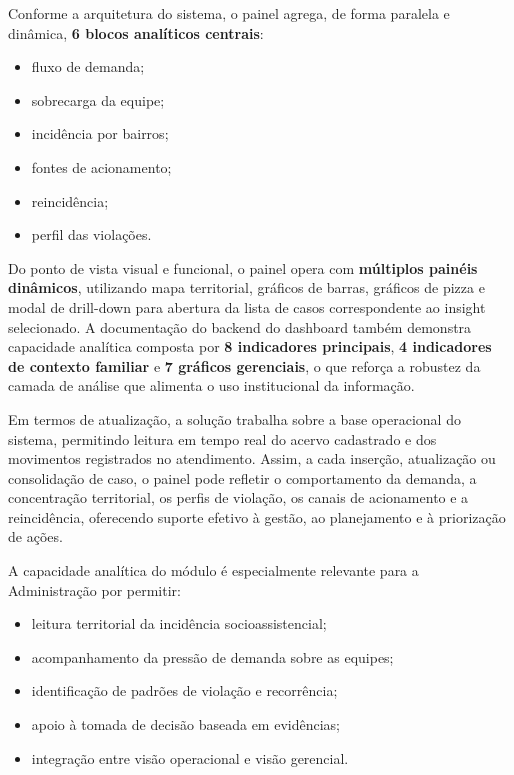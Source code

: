 \documentclass[12pt,a4paper]{article}
\begin{document}
Conforme a arquitetura do sistema, o painel agrega, de forma paralela e dinâmica, \textbf{6 blocos analíticos centrais}:

\begin{itemize}[leftmargin=1.5cm]
\item fluxo de demanda;
\item sobrecarga da equipe;
\item incidência por bairros;
\item fontes de acionamento;
\item reincidência;
\item perfil das violações.
\end{itemize}

Do ponto de vista visual e funcional, o painel opera com \textbf{múltiplos painéis dinâmicos}, utilizando mapa territorial, gráficos de barras, gráficos de pizza e modal de drill-down para abertura da lista de casos correspondente ao insight selecionado. A documentação do backend do dashboard também demonstra capacidade analítica composta por \textbf{8 indicadores principais}, \textbf{4 indicadores de contexto familiar} e \textbf{7 gráficos gerenciais}, o que reforça a robustez da camada de análise que alimenta o uso institucional da informação.

Em termos de atualização, a solução trabalha sobre a base operacional do sistema, permitindo leitura em tempo real do acervo cadastrado e dos movimentos registrados no atendimento. Assim, a cada inserção, atualização ou consolidação de caso, o painel pode refletir o comportamento da demanda, a concentração territorial, os perfis de violação, os canais de acionamento e a reincidência, oferecendo suporte efetivo à gestão, ao planejamento e à priorização de ações.

A capacidade analítica do módulo é especialmente relevante para a Administração por permitir:

\begin{itemize}[leftmargin=1.5cm]
\item leitura territorial da incidência socioassistencial;
\item acompanhamento da pressão de demanda sobre as equipes;
\item identificação de padrões de violação e recorrência;
\item apoio à tomada de decisão baseada em evidências;
\item integração entre visão operacional e visão gerencial.
\end{itemize}
\end{document}

